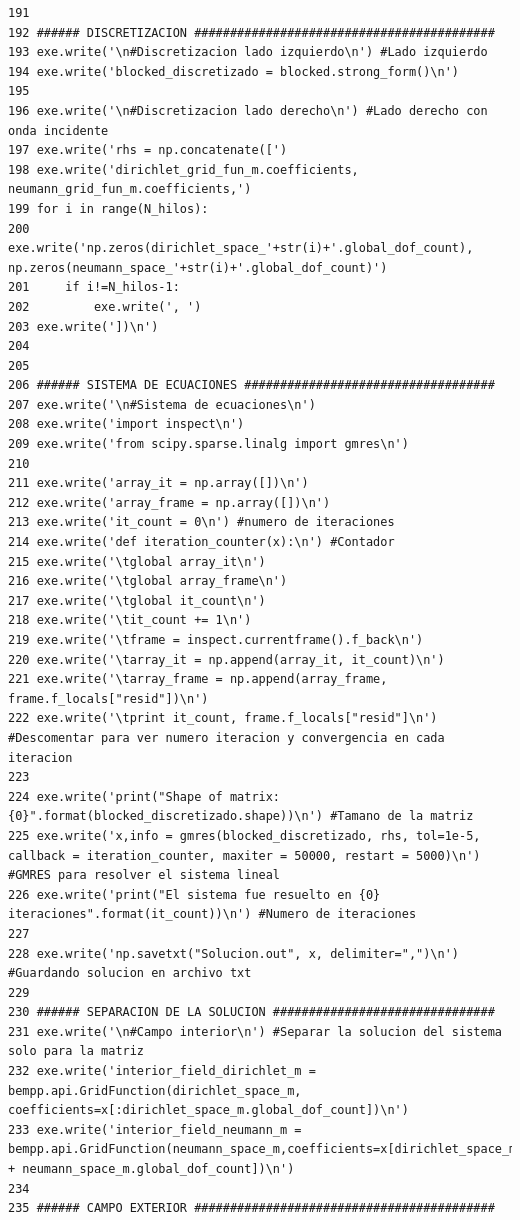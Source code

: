 \documentclass[12pt,letterpaper]{article}
\numberwithin{equation}{section}
\begin{document}
\begin{lstlisting}
191 
192 ###### DISCRETIZACION ##########################################
193 exe.write('\n#Discretizacion lado izquierdo\n') #Lado izquierdo
194 exe.write('blocked_discretizado = blocked.strong_form()\n')
195 
196 exe.write('\n#Discretizacion lado derecho\n') #Lado derecho con onda incidente
197 exe.write('rhs = np.concatenate([')
198 exe.write('dirichlet_grid_fun_m.coefficients, neumann_grid_fun_m.coefficients,')
199 for i in range(N_hilos):
200     exe.write('np.zeros(dirichlet_space_'+str(i)+'.global_dof_count), np.zeros(neumann_space_'+str(i)+'.global_dof_count)')
201     if i!=N_hilos-1:
202         exe.write(', ')
203 exe.write('])\n')
204 
205 
206 ###### SISTEMA DE ECUACIONES ###################################
207 exe.write('\n#Sistema de ecuaciones\n')
208 exe.write('import inspect\n')
209 exe.write('from scipy.sparse.linalg import gmres\n')
210 
211 exe.write('array_it = np.array([])\n')
212 exe.write('array_frame = np.array([])\n')
213 exe.write('it_count = 0\n') #numero de iteraciones
214 exe.write('def iteration_counter(x):\n') #Contador
215 exe.write('\tglobal array_it\n')
216 exe.write('\tglobal array_frame\n')
217 exe.write('\tglobal it_count\n')
218 exe.write('\tit_count += 1\n')
219 exe.write('\tframe = inspect.currentframe().f_back\n')
220 exe.write('\tarray_it = np.append(array_it, it_count)\n')
221 exe.write('\tarray_frame = np.append(array_frame, frame.f_locals["resid"])\n')
222 exe.write('\tprint it_count, frame.f_locals["resid"]\n') #Descomentar para ver numero iteracion y convergencia en cada iteracion
223 
224 exe.write('print("Shape of matrix: {0}".format(blocked_discretizado.shape))\n') #Tamano de la matriz
225 exe.write('x,info = gmres(blocked_discretizado, rhs, tol=1e-5, callback = iteration_counter, maxiter = 50000, restart = 5000)\n') #GMRES para resolver el sistema lineal
226 exe.write('print("El sistema fue resuelto en {0} iteraciones".format(it_count))\n') #Numero de iteraciones
227 
228 exe.write('np.savetxt("Solucion.out", x, delimiter=",")\n') #Guardando solucion en archivo txt
229 
230 ###### SEPARACION DE LA SOLUCION ###############################
231 exe.write('\n#Campo interior\n') #Separar la solucion del sistema solo para la matriz
232 exe.write('interior_field_dirichlet_m = bempp.api.GridFunction(dirichlet_space_m, coefficients=x[:dirichlet_space_m.global_dof_count])\n')
233 exe.write('interior_field_neumann_m = bempp.api.GridFunction(neumann_space_m,coefficients=x[dirichlet_space_m.global_dof_count:dirichlet_space_m.global_dof_count + neumann_space_m.global_dof_count])\n')
234 
235 ###### CAMPO EXTERIOR ##########################################

\end{lstlisting}
\end{document}
